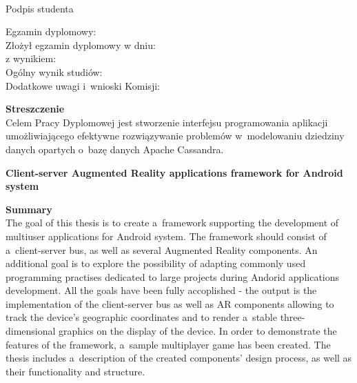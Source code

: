 \vspace{2cm}
 
\begin{flushright}
  \begin{minipage}{5cm}
   \dotfill \\[-0.7cm]
   \begin{center}
   \small Podpis studenta
   \end{center}
  \end{minipage}
 \end{flushright}
 
 \vspace{3cm}
 
 \begin{flushleft}
  Egzamin dyplomowy: \\
  Złożył egzamin dyplomowy w dniu: \dotfill \\
  z wynikiem: \dotfill \\
  Ogólny wynik studiów: \dotfill \\
  Dodatkowe uwagi i~wnioski Komisji: \dotfill \\
  \hspace{0cm} \dotfill
\end{flushleft}
 
  
\newpage
\thispagestyle{empty}
 
\textbf{Streszczenie} \\
 
  Celem Pracy Dyplomowej jest stworzenie interfejsu programowania aplikacji umożliwiającego efektywne rozwiązywanie problemów w~modelowaniu dziedziny danych opartych o~bazę danych Apache Cassandra.
 
 
 \begin{center}
  \large \textbf{Client-server Augmented Reality applications framework for Android system}
 \end{center}

 \vspace*{1cm}
 
 \textbf{Summary} \\
 
  The goal of this thesis is to create a~framework supporting the development of multiuser applications for Android system.
  The framework should consist of a~client-server bus, as well as several Augmented Reality components.
  An additional goal is to explore the possibility of adapting commonly used programming practises dedicated to large projects during Andorid applications development.
  All the goals have been fully accoplished - the output is the implementation of the client-server bus as well as AR components allowing to track the device's geographic coordinates and to render a~stable three-dimensional graphics on the display of the device.
  In order to demonstrate the features of the framework, a~sample multiplayer game has been created.
  The thesis includes a~description of the created components' design process, as well as their functionality and structure.
 
